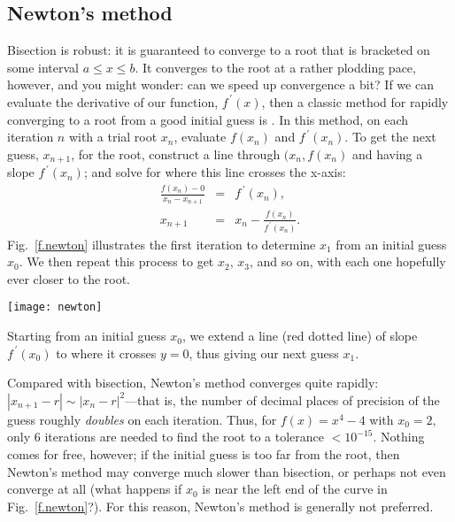 \subsection{Newton's method}
Bisection is robust: it is guaranteed to converge to a root that is bracketed on some interval $a \le x \le b$. It converges to the root at a rather plodding pace, however, and you might wonder: can we speed up convergence a bit? If we can evaluate the derivative of our function, $f^{\,\prime}(x)$, then a classic method for rapidly converging to a root from a good initial guess is .  In this method, on each iteration $n$ with a trial root $x_{n}$, evaluate $f(x_{n})$ and $f^{\,\prime}(x_{n})$. To get the next guess, $x_{n+1}$, for the root, construct a line through $(x_{n},f(x_{n})$ and having a slope $f^{\,\prime}(x_{n})$; and solve for where this line crosses the x-axis:
\begin{eqnarray*}
\frac{f(x_{n})-0}{x_{n}-x_{n+1}} &=& f^{\,\prime}(x_{n}),\\
x_{n+1} &=& x_{n} - \frac{f(x_{n})}{f^{\,\prime}(x_{n})}.
\end{eqnarray*}
Fig.~\ref{f.newton} illustrates the first iteration to determine $x_{1}$ from an initial guess $x_{0}$. We then repeat this process to get $x_{2}$, $x_{3}$, and so on, with each one hopefully ever closer to the root.
\begin{marginfigure}[-8\baselineskip]
\texttt{[image: newton]}
\caption[Schematic of Newton's method]{Starting from an initial guess $x_{0}$, we extend a line (red dotted line) of slope $f^{\,\prime}(x_{0})$ to where it crosses $y=0$, thus giving our next guess $x_{1}$.\label{f.newton}}
\end{marginfigure}

Compared with bisection, Newton's method converges quite rapidly: $|x_{n+1}-r| \sim |x_{n}-r|^{2}$---that is, the number of decimal places of precision of the guess roughly \emph{doubles} on each iteration.  Thus, for  $f(x) = x^{4}-4$ with $x_{0}=2$, only 6 iterations are needed to find the root to a tolerance $< 10^{-15}$. Nothing comes for free, however; if the initial guess is too far from the root, then Newton's method may converge much slower than bisection, or perhaps not even converge at all (what happens if $x_{0}$ is near the left end of the curve in Fig.~\ref{f.newton}?).
For this reason, Newton's method is generally not preferred.

